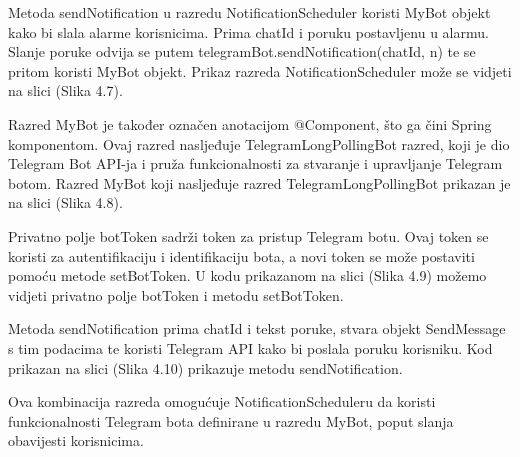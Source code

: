 \documentclass[times, utf8, zavrsni]{fer}
\begin{document}
Metoda {\selectfont sendNotification} u razredu {\selectfont NotificationScheduler} koristi {\selectfont MyBot} objekt kako bi slala alarme korisnicima. Prima chatId i poruku postavljenu u alarmu. Slanje poruke odvija se putem {\selectfont telegramBot.sendNotification(chatId, n)}  te se pritom koristi {\selectfont MyBot} objekt. Prikaz razreda {\selectfont NotificationScheduler} može se vidjeti na slici (Slika 4.7).

Razred {\selectfont MyBot} je također označen anotacijom @Component, što ga čini Spring komponentom. Ovaj razred nasljeđuje {\selectfont TelegramLongPollingBot} razred, koji je dio Telegram Bot API-ja i pruža funkcionalnosti za stvaranje i upravljanje Telegram botom. Razred {\selectfont MyBot} koji nasljeđuje razred {\selectfont TelegramLongPollingBot} prikazan je na slici (Slika 4.8). 

Privatno polje {\selectfont botToken} sadrži token za pristup Telegram botu. Ovaj token se koristi za autentifikaciju i identifikaciju bota, a novi token se može postaviti pomoću metode {\selectfont setBotToken}. U kodu prikazanom na slici (Slika 4.9) možemo vidjeti privatno polje {\selectfont botToken} i metodu {\selectfont setBotToken}. 

Metoda {\selectfont sendNotification} prima chatId i tekst poruke, stvara objekt {\selectfont SendMessage} s tim podacima te koristi Telegram API kako bi poslala poruku korisniku. Kod prikazan na slici (Slika 4.10) prikazuje metodu {\selectfont sendNotification}. 

Ova kombinacija razreda omogućuje {\selectfont NotificationScheduleru} da koristi funkcionalnosti Telegram bota definirane u razredu {\selectfont MyBot}, poput slanja obavijesti korisnicima.
\end{document}
